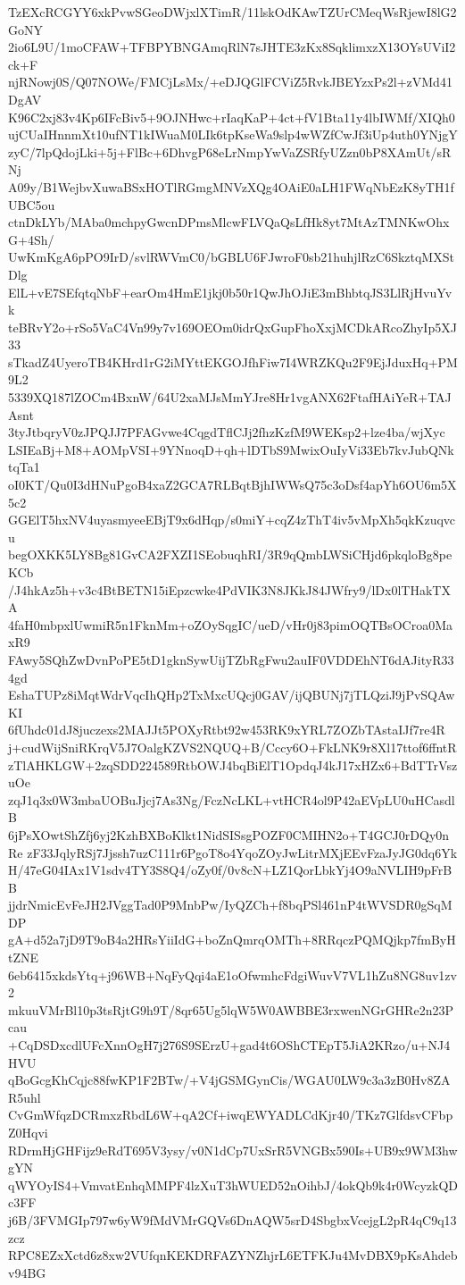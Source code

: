 TzEXcRCGYY6xkPvwSGeoDWjxlXTimR/11lskOdKAwTZUrCMeqWsRjewI8lG2GoNY
2io6L9U/1moCFAW+TFBPYBNGAmqRlN7sJHTE3zKx8SqklimxzX13OYsUViI2ck+F
njRNowj0S/Q07NOWe/FMCjLsMx/+eDJQGlFCViZ5RvkJBEYzxPs2l+zVMd41DgAV
K96C2xj83v4Kp6IFcBiv5+9OJNHwc+rIaqKaP+4ct+fV1Bta11y4lbIWMf/XIQh0
ujCUaIHnnmXt10ufNT1kIWuaM0LIk6tpKseWa9slp4wWZfCwJf3iUp4uth0YNjgY
zyC/7lpQdojLki+5j+FlBc+6DhvgP68eLrNmpYwVaZSRfyUZzn0bP8XAmUt/sRNj
A09y/B1WejbvXuwaBSxHOTlRGmgMNVzXQg4OAiE0aLH1FWqNbEzK8yTH1fUBC5ou
ctnDkLYb/MAba0mchpyGwcnDPmsMlcwFLVQaQsLfHk8yt7MtAzTMNKwOhxG+4Sh/
UwKmKgA6pPO9IrD/svlRWVmC0/bGBLU6FJwroF0sb21huhjlRzC6SkztqMXStDlg
ElL+vE7SEfqtqNbF+earOm4HmE1jkj0b50r1QwJhOJiE3mBhbtqJS3LlRjHvuYvk
teBRvY2o+rSo5VaC4Vn99y7v169OEOm0idrQxGupFhoXxjMCDkARcoZhyIp5XJ33
sTkadZ4UyeroTB4KHrd1rG2iMYttEKGOJfhFiw7I4WRZKQu2F9EjJduxHq+PM9L2
5339XQ187lZOCm4BxnW/64U2xaMJsMmYJre8Hr1vgANX62FtafHAiYeR+TAJAsnt
3tyJtbqryV0zJPQJJ7PFAGvwe4CqgdTflCJj2fhzKzfM9WEKsp2+lze4ba/wjXyc
LSIEaBj+M8+AOMpVSI+9YNnoqD+qh+lDTbS9MwixOuIyVi33Eb7kvJubQNktqTa1
oI0KT/Qu0I3dHNuPgoB4xaZ2GCA7RLBqtBjhIWWsQ75c3oDsf4apYh6OU6m5X5c2
GGElT5hxNV4uyasmyeeEBjT9x6dHqp/s0miY+cqZ4zThT4iv5vMpXh5qkKzuqvcu
begOXKK5LY8Bg81GvCA2FXZI1SEobuqhRI/3R9qQmbLWSiCHjd6pkqloBg8peKCb
/J4hkAz5h+v3c4BtBETN15iEpzcwke4PdVIK3N8JKkJ84JWfry9/lDx0lTHakTXA
4faH0mbpxlUwmiR5n1FknMm+oZOySqgIC/ueD/vHr0j83pimOQTBsOCroa0MaxR9
FAwy5SQhZwDvnPoPE5tD1gknSywUijTZbRgFwu2auIF0VDDEhNT6dAJityR334gd
EshaTUPz8iMqtWdrVqcIhQHp2TxMxcUQcj0GAV/ijQBUNj7jTLQziJ9jPvSQAwKI
6fUhdc01dJ8juczexs2MAJJt5POXyRtbt92w453RK9xYRL7ZOZbTAstaIJf7re4R
j+cudWijSniRKrqV5J7OalgKZVS2NQUQ+B/Cccy6O+FkLNK9r8Xl17ttof6ffntR
zTlAHKLGW+2zqSDD224589RtbOWJ4bqBiElT1OpdqJ4kJ17xHZx6+BdTTrVszuOe
zqJ1q3x0W3mbaUOBuJjcj7As3Ng/FczNcLKL+vtHCR4ol9P42aEVpLU0uHCasdlB
6jPsXOwtShZfj6yj2KzhBXBoKlkt1NidSISsgPOZF0CMIHN2o+T4GCJ0rDQy0nRe
zF33JqlyRSj7Jjssh7uzC111r6PgoT8o4YqoZOyJwLitrMXjEEvFzaJyJG0dq6Yk
H/47eG04IAx1V1sdv4TY3S8Q4/oZy0f/0v8cN+LZ1QorLbkYj4O9aNVLIH9pFrBB
jjdrNmicEvFeJH2JVggTad0P9MnbPw/IyQZCh+f8bqPSl461nP4tWVSDR0gSqMDP
gA+d52a7jD9T9oB4a2HRsYiiIdG+boZnQmrqOMTh+8RRqczPQMQjkp7fmByHtZNE
6eb6415xkdsYtq+j96WB+NqFyQqi4aE1oOfwmhcFdgiWuvV7VL1hZu8NG8uv1zv2
mkuuVMrBl10p3tsRjtG9h9T/8qr65Ug5lqW5W0AWBBE3rxwenNGrGHRe2n23Pcau
+CqDSDxcdlUFcXnnOgH7j276S9SErzU+gad4t6OShCTEpT5JiA2KRzo/u+NJ4HVU
qBoGcgKhCqjc88fwKP1F2BTw/+V4jGSMGynCis/WGAU0LW9c3a3zB0Hv8ZAR5uhl
CvGmWfqzDCRmxzRbdL6W+qA2Cf+iwqEWYADLCdKjr40/TKz7GlfdsvCFbpZ0Hqvi
RDrmHjGHFijz9eRdT695V3ysy/v0N1dCp7UxSrR5VNGBx590Is+UB9x9WM3hwgYN
qWYOyIS4+VmvatEnhqMMPF4lzXuT3hWUED52nOihbJ/4okQb9k4r0WcyzkQDc3FF
j6B/3FVMGIp797w6yW9fMdVMrGQVs6DnAQW5srD4SbgbxVcejgL2pR4qC9q13zcz
RPC8EZxXctd6z8xw2VUfqnKEKDRFAZYNZhjrL6ETFKJu4MvDBX9pKsAhdebv94BG
